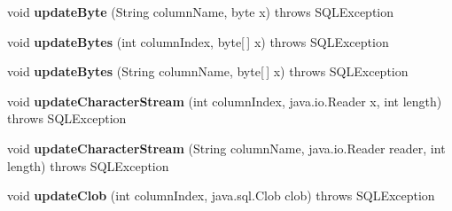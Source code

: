 \begin{DoxyCompactItemize}
\item 
\mbox{\label{classcom_1_1mysql_1_1cj_1_1jdbc_1_1result_1_1_updatable_result_set_acc515aed62879e042cebd169c890040d}} 
void {\bfseries update\+Byte} (String column\+Name, byte x)  throws S\+Q\+L\+Exception 
\item 
\mbox{\label{classcom_1_1mysql_1_1cj_1_1jdbc_1_1result_1_1_updatable_result_set_aba50c563e3ed3503972ca3f1f880d785}} 
void {\bfseries update\+Bytes} (int column\+Index, byte\mbox{[}$\,$\mbox{]} x)  throws S\+Q\+L\+Exception 
\item 
\mbox{\label{classcom_1_1mysql_1_1cj_1_1jdbc_1_1result_1_1_updatable_result_set_aea4a9d0c80d3eaa266564f411f5eb6aa}} 
void {\bfseries update\+Bytes} (String column\+Name, byte\mbox{[}$\,$\mbox{]} x)  throws S\+Q\+L\+Exception 
\item 
\mbox{\label{classcom_1_1mysql_1_1cj_1_1jdbc_1_1result_1_1_updatable_result_set_ae3dca7e7b35cac80a6a15deacde57e5b}} 
void {\bfseries update\+Character\+Stream} (int column\+Index, java.\+io.\+Reader x, int length)  throws S\+Q\+L\+Exception 
\item 
\mbox{\label{classcom_1_1mysql_1_1cj_1_1jdbc_1_1result_1_1_updatable_result_set_a6e5325dc8df473c2155075cfd699c3a2}} 
void {\bfseries update\+Character\+Stream} (String column\+Name, java.\+io.\+Reader reader, int length)  throws S\+Q\+L\+Exception 
\item 
\mbox{\label{classcom_1_1mysql_1_1cj_1_1jdbc_1_1result_1_1_updatable_result_set_adbbf08a2da624a52ab2585084588912d}} 
void {\bfseries update\+Clob} (int column\+Index, java.\+sql.\+Clob clob)  throws S\+Q\+L\+Exception 
\item 
\mbox{\label{classcom_1_1mysql_1_1cj_1_1jdbc_1_1result_1_1_updatable_result_set_a2990155ee7e12af7c254ef5a52dcda3b}} 

\end{DoxyCompactItemize}

